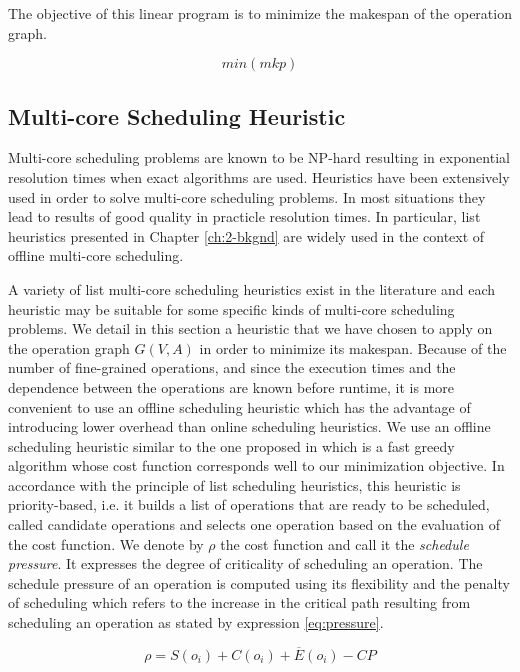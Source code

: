 The objective of this linear program is to minimize the makespan of the operation graph.

\begin{equation}
min(mkp)
\label{sched:obj}
\end{equation} 

\subsection{Multi-core Scheduling Heuristic}

Multi-core scheduling problems are known to be NP-hard resulting in exponential resolution times when exact algorithms are used. Heuristics have been extensively used in order to solve multi-core scheduling problems. In most situations they lead to results of good quality in practicle resolution times. In particular, list heuristics presented in Chapter \ref{ch:2-bkgnd} are widely used in the context of offline multi-core scheduling.

A variety of list multi-core scheduling heuristics exist in the literature and each heuristic may be suitable for some specific kinds of multi-core scheduling problems. We detail in this section a heuristic that we have chosen to apply on the operation graph $G(V,A)$ in order to minimize its makespan. Because of the number of fine-grained operations, and since the execution times and the dependence between the operations are known before runtime, it is more convenient to use an offline scheduling heuristic which has the advantage of introducing lower overhead than online scheduling heuristics. We use an offline scheduling heuristic similar to the one proposed in \cite{grandpierre:1999} which is a fast greedy algorithm whose cost function corresponds well to our minimization objective. In accordance with the principle of list scheduling heuristics, this heuristic is priority-based, i.e. it builds a list of operations that are ready to be scheduled, called candidate operations and selects one operation based on the evaluation of the cost function. We denote by $\rho$ the cost function and call it the \textit{schedule pressure}. It expresses the degree of criticality of scheduling an operation. The schedule pressure of an operation is computed using its flexibility and the penalty of scheduling which refers to the increase in the critical path resulting from scheduling an operation as stated by expression \ref{eq:pressure}.

\begin{equation}
\rho = S(o_i) + C(o_i) + \overline{E}(o_i) - CP
\label{eq:pressure}
\end{equation}

